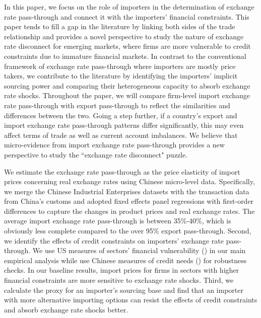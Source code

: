 \documentclass[12pt]{article}
\begin{document}
In this paper, we focus on the role of importers in the determination of exchange rate pass-through and connect it with the importers' financial constraints. This paper tends to fill a gap in the literature by linking both sides of the trade relationship and provides a novel perspective to study the nature of exchange rate disconnect for emerging markets, where firms are more vulnerable to credit constraints due to immature financial markets. In contrast to the conventional framework of exchange rate pass-through where importers are mostly price takers, we contribute to the literature by identifying the importers' implicit sourcing power and comparing their heterogeneous capacity to absorb exchange rate shocks. Throughout the paper, we will compare firm-level import exchange rate pass-through with export pass-through to reflect the similarities and differences between the two. Going a step further, if a country's export and import exchange rate pass-through patterns differ significantly, this may even affect terms of trade as well as current account imbalances. We believe that micro-evidence from import exchange rate pass-through provides a new perspective to study the ``exchange rate disconnect" puzzle.

We estimate the exchange rate pass-through as the price elasticity of import prices concerning real exchange rates using Chinese micro-level data. Specifically, we merge the Chinese Industrial Enterprises datasets with the transaction data from China’s customs and adopted fixed effects panel regressions with first-order differences to capture the changes in product prices and real exchange rates. The average import exchange rate pass-through is between 35\%-40\%, which is obviously less complete compared to the over 95\% export pass-through. Second, we identify the effects of credit constraints on importers' exchange rate pass-through. We use US measures of sectors’ financial vulnerability (\cite{manova-wei-zhang2015}) in our main empirical analysis while use Chinese measures of credit needs (\cite{fan-li-yeaple2015}) for robustness checks. In our baseline results, import prices for firms in sectors with higher financial constraints are more sensitive to exchange rate shocks. Third, we calculate the proxy for an importer's sourcing base and find that an importer with more alternative importing options can resist the effects of credit constraints and absorb exchange rate shocks better.
\end{document}
